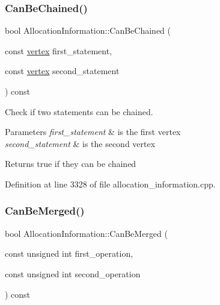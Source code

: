 \subsubsection{\texorpdfstring{Can\+Be\+Chained()}{CanBeChained()}\hspace{0.1cm}{\footnotesize\ttfamily [2/2]}}
{\footnotesize\ttfamily bool Allocation\+Information\+::\+Can\+Be\+Chained (\begin{DoxyParamCaption}\item[{const \hyperlink{graph_8hpp_abefdcf0544e601805af44eca032cca14}{vertex}}]{first\+\_\+statement,  }\item[{const \hyperlink{graph_8hpp_abefdcf0544e601805af44eca032cca14}{vertex}}]{second\+\_\+statement }\end{DoxyParamCaption}) const}



Check if two statements can be chained. 


\begin{DoxyParams}{Parameters}
{\em first\+\_\+statement} & is the first vertex \\
\hline
{\em second\+\_\+statement} & is the second vertex \\
\hline
\end{DoxyParams}
\begin{DoxyReturn}{Returns}
true if they can be chained 
\end{DoxyReturn}


Definition at line 3328 of file allocation\+\_\+information.\+cpp.

\mbox{\label{classAllocationInformation_ac13ce76541d29e2028a9beaa2df92ec7}} 
\subsubsection{\texorpdfstring{Can\+Be\+Merged()}{CanBeMerged()}}
{\footnotesize\ttfamily bool Allocation\+Information\+::\+Can\+Be\+Merged (\begin{DoxyParamCaption}\item[{const unsigned int}]{first\+\_\+operation,  }\item[{const unsigned int}]{second\+\_\+operation }\end{DoxyParamCaption}) const\hspace{0.3cm}{\ttfamily [private]}}



